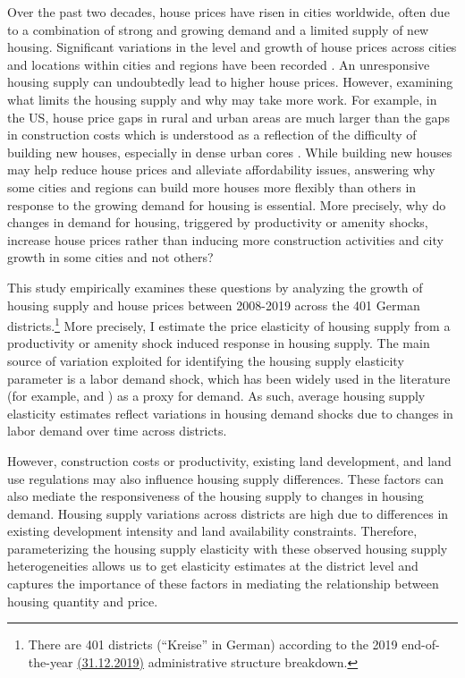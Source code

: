 \documentclass[
  12pt,
]{article}
\begin{document}
Over the past two decades, house prices have risen in cities worldwide,
often due to a combination of strong and growing demand and a limited
supply of new housing. Significant variations in the level and growth of
house prices across cities and locations within cities and regions have
been recorded \citep{glaeser_2020, hilber_mense_2021}. An unresponsive
housing supply can undoubtedly lead to higher house prices. However,
examining what limits the housing supply and why may take more work. For
example, in the US, house price gaps in rural and urban areas are much
larger than the gaps in construction costs which is understood as a
reflection of the difficulty of building new houses, especially in dense
urban cores \citep{glaeser_2020}. While building new houses may help
reduce house prices and alleviate affordability issues, answering why
some cities and regions can build more houses more flexibly than others
in response to the growing demand for housing is essential. More
precisely, why do changes in demand for housing, triggered by
productivity or amenity shocks, increase house prices rather than
inducing more construction activities and city growth in some cities and
not others?

This study empirically examines these questions by analyzing the growth
of housing supply and house prices between 2008-2019 across the 401
German districts.\footnote{There are 401 districts (``Kreise'' in
  German) according to the 2019 end-of-the-year
  \href{https://www.destatis.de/DE/Themen/Laender-Regionen/Regionales/Gemeindeverzeichnis/Administrativ/Archiv/Verwaltungsgliederung/31122019_Jahr.html}{(31.12.2019)}
  administrative structure breakdown.} More precisely, I estimate the
price elasticity of housing supply from a productivity or amenity shock
induced response in housing supply. The main source of variation
exploited for identifying the housing supply elasticity parameter is a
\citet{bartik_1991} labor demand shock, which has been widely used in
the literature (for example, \citet{saiz_2010} and
\citet{baum-snow_han_2019}) as a proxy for demand. As such, average
housing supply elasticity estimates reflect variations in housing demand
shocks due to changes in labor demand over time across districts.

However, construction costs or productivity, existing land development,
and land use regulations may also influence housing supply differences.
These factors can also mediate the responsiveness of the housing supply
to changes in housing demand. Housing supply variations across districts
are high due to differences in existing development intensity and land
availability constraints. Therefore, parameterizing the housing supply
elasticity with these observed housing supply heterogeneities allows us
to get elasticity estimates at the district level and captures the
importance of these factors in mediating the relationship between
housing quantity and price.
\end{document}
